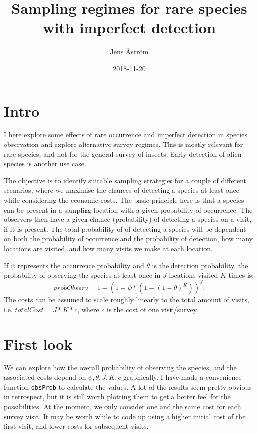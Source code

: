 \documentclass[]{article}
\title{Sampling regimes for rare species with imperfect detection}
\author{Jens Åström}
\date{2018-11-20}
\begin{document}
\maketitle

\section{Intro}\label{intro}

I here explore some effects of rare occurrence and imperfect detection
in species observation and explore alternative survey regimes. This is
mostly relevant for rare species, and not for the general survey of
insects. Early detection of alien species is another use case.

The objective is to identify suitable sampling strategies for a couple
of different scenarios, where we maximise the chances of detecting a
species at least once while considering the economic costs. The basic
principle here is that a species can be present in a sampling location
with a given probability of occurrence. The observers then have a given
chance (probability) of detecting a species on a visit, if it is
present. The total probability of of detecting a species will be
dependent on both the probability of occurrence and the probability of
detection, how many locations are visited, and how many visits we make
at each location.

If \(\psi\) represents the occurrence probability and \(\theta\) is the
detection probability, the probability of observing the species at least
once in \(J\) locations visited \(K\) times is:
\[probObserv = 1 - (1 - \psi * (1 - (1 - \theta)^K))^J.\] The costs can
be assumed to scale roughly linearly to the total amount of visits, i.e.
\(totalCost = J * K * c\), where \(c\) is the cost of one visit/survey.

\section{First look}\label{first-look}

We can explore how the overall probability of observing the species, and
the associated costs depend on \(\psi, \theta, J, K, c\) graphically. I
have made a convenience function \texttt{obsProb} to calculate the
values. A lot of the results seem pretty obvious in retrospect, but it
is still worth plotting them to get a better feel for the possibilities.
At the moment, we only consider one and the same cost for each survey
visit. It may be worth while to code up using a higher initial cost of
the first visit, and lower costs for subsequent visits.
\end{document}

